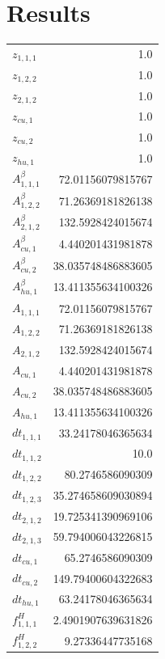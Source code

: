 \documentclass{article}%
\makeatletter
\let\mcnewpage=\newpage%
\newcommand{\TrickSupertabularIntoMulticols}{%
\renewcommand\newpage{%
\if@firstcolumn%
\hrule width\linewidth height0pt%
\columnbreak%
\else%
\mcnewpage%
\fi%
}%
}%
\makeatother
\begin{document}
\section{Results}%
\thispagestyle{plain}%
\begin{multicols*}{3}%
\TrickSupertabularIntoMulticols%
%
\begin{supertabular}{lr}%
	$z_{1,1,1}$ & 1.0 \\%
	$z_{1,2,2}$ & 1.0 \\%
	$z_{2,1,2}$ & 1.0 \\%
	$z_{cu,1}$ & 1.0 \\%
	$z_{cu,2}$ & 1.0 \\%
	$z_{hu,1}$ & 1.0 \\%
	$A_{1,1,1}^{\beta}$ & 72.01156079815767 \\%
	$A_{1,2,2}^{\beta}$ & 71.26369181826138 \\%
	$A_{2,1,2}^{\beta}$ & 132.5928424015674 \\%
	$A_{cu,1}^{\beta}$ & 4.440201431981878 \\%
	$A_{cu,2}^{\beta}$ & 38.035748486883605 \\%
	$A_{hu,1}^{\beta}$ & 13.411355634100326 \\%
	$A_{1,1,1}$ & 72.01156079815767 \\%
	$A_{1,2,2}$ & 71.26369181826138 \\%
	$A_{2,1,2}$ & 132.5928424015674 \\%
	$A_{cu,1}$ & 4.440201431981878 \\%
	$A_{cu,2}$ & 38.035748486883605 \\%
	$A_{hu,1}$ & 13.411355634100326 \\%
	$dt_{1,1,1}$ & 33.24178046365634 \\%
	$dt_{1,1,2}$ & 10.0 \\%
	$dt_{1,2,2}$ & 80.2746586090309 \\%
	$dt_{1,2,3}$ & 35.274658609030894 \\%
	$dt_{2,1,2}$ & 19.725341390969106 \\%
	$dt_{2,1,3}$ & 59.794006043226815 \\%
	$dt_{cu,1}$ & 65.2746586090309 \\%
	$dt_{cu,2}$ & 149.79400604322683 \\%
	$dt_{hu,1}$ & 63.24178046365634 \\%
	$f_{1,1,1}^{H}$ & 2.4901907639631826 \\%
	$f_{1,2,2}^{H}$ & 9.27336447735168 \\%

\end{supertabular}
\end{multicols*}
\end{document}

